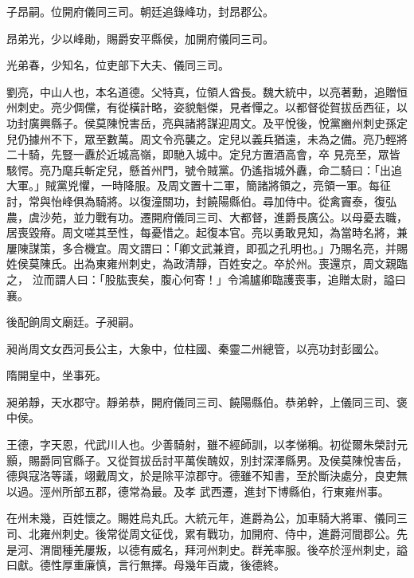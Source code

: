\begin{pinyinscope}
 子昂嗣。位開府儀同三司。朝廷追錄峰功，封昂郡公。



 昂弟光，少以峰勛，賜爵安平縣侯，加開府儀同三司。



 光弟春，少知名，位吏部下大夫、儀同三司。



 劉亮，中山人也，本名道德。父特真，位領人酋長。魏大統中，以亮著勳，追贈恒州刺史。亮少倜儻，有從橫計略，姿貌魁傑，見者憚之。以都督從賀拔岳西征，以功封廣興縣子。侯莫陳悅害岳，亮與諸將謀迎周文。及平悅後，悅黨豳州刺史孫定兒仍據州不下，眾至數萬。周文令亮襲之。定兒以義兵猶遠，未為之備。亮乃輕將二十騎，先豎一纛於近城高嶺，即馳入城中。定兒方置酒高會，卒
 見亮至，眾皆駭愕。亮乃麾兵斬定兒，懸首州門，號令賊黨。仍遙指城外纛，命二騎曰：「出追大軍。」賊黨兇懼，一時降服。及周文置十二軍，簡諸將領之，亮領一軍。每征討，常與怡峰俱為騎將。以復潼關功，封饒陽縣伯。尋加侍中。從禽竇泰，復弘農，虞沙苑，並力戰有功。遷開府儀同三司、大都督，進爵長廣公。以母憂去職，居喪毀瘠。周文嗟其至性，每憂惜之。起復本官。亮以勇敢見知，為當時名將，兼屢陳謀策，多合機宜。周文謂曰：「卿文武兼資，即孤之孔明也。」乃賜名亮，并賜姓侯莫陳氏。出為東雍州刺史，為政清靜，百姓安之。卒於州。喪還京，周文親臨之，
 泣而謂人曰：「股肱喪矣，腹心何寄！」令鴻臚卿臨護喪事，追贈太尉，謚曰襄。



 後配餉周文廟廷。子昶嗣。



 昶尚周文女西河長公主，大象中，位柱國、秦靈二州總管，以亮功封彭國公。



 隋開皇中，坐事死。



 昶弟靜，天水郡守。靜弟恭，開府儀同三司、饒陽縣伯。恭弟幹，上儀同三司、褒中侯。



 王德，字天恩，代武川人也。少善騎射，雖不經師訓，以孝悌稱。初從爾朱榮討元顥，賜爵同官縣子。又從賀拔岳討平萬俟醜奴，別封深澤縣男。及侯莫陳悅害岳，德與寇洛等議，翊戴周文，於是除平涼郡守。德雖不知書，至於斷決處分，良吏無以過。涇州所部五郡，德常為最。及孝
 武西遷，進封下博縣伯，行東雍州事。



 在州未幾，百姓懷之。賜姓烏丸氏。大統元年，進爵為公，加車騎大將軍、儀同三司、北雍州刺史。後常從周文征伐，累有戰功，加開府、侍中，進爵河間郡公。先是河、渭間種羌屢叛，以德有威名，拜河州刺史。群羌率服。後卒於涇州刺史，謚曰獻。德性厚重廉慎，言行無擇。母幾年百歲，後德終。




\end{pinyinscope}
